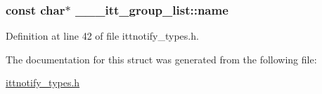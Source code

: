 \hypertarget{struct______itt__group__list_a7ec0e147be42b6d715189f283d6d6784}{
\subsubsection[{name}]{\setlength{\rightskip}{0pt plus 5cm}const char$\ast$ \-\_\-\-\_\-\-\_\-itt\-\_\-group\-\_\-list\-::name}}\label{struct______itt__group__list_a7ec0e147be42b6d715189f283d6d6784}


Definition at line 42 of file ittnotify\-\_\-types.\-h.



The documentation for this struct was generated from the following file\-:\begin{DoxyCompactItemize}
\item 
\hyperlink{ittnotify__types_8h}{ittnotify\-\_\-types.\-h}\end{DoxyCompactItemize}
